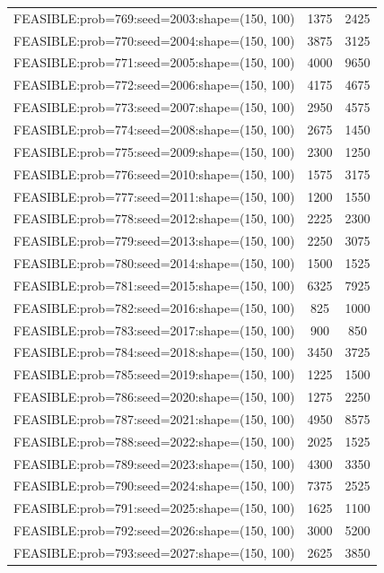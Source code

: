 \begin{longtable}{lcc}
FEASIBLE:prob=769:seed=2003:shape=(150, 100) &     1375 &  2425 \\
FEASIBLE:prob=770:seed=2004:shape=(150, 100) &     3875 &  3125 \\
FEASIBLE:prob=771:seed=2005:shape=(150, 100) &     4000 &  9650 \\
FEASIBLE:prob=772:seed=2006:shape=(150, 100) &     4175 &  4675 \\
FEASIBLE:prob=773:seed=2007:shape=(150, 100) &     2950 &  4575 \\
FEASIBLE:prob=774:seed=2008:shape=(150, 100) &     2675 &  1450 \\
FEASIBLE:prob=775:seed=2009:shape=(150, 100) &     2300 &  1250 \\
FEASIBLE:prob=776:seed=2010:shape=(150, 100) &     1575 &  3175 \\
FEASIBLE:prob=777:seed=2011:shape=(150, 100) &     1200 &  1550 \\
FEASIBLE:prob=778:seed=2012:shape=(150, 100) &     2225 &  2300 \\
FEASIBLE:prob=779:seed=2013:shape=(150, 100) &     2250 &  3075 \\
FEASIBLE:prob=780:seed=2014:shape=(150, 100) &     1500 &  1525 \\
FEASIBLE:prob=781:seed=2015:shape=(150, 100) &     6325 &  7925 \\
FEASIBLE:prob=782:seed=2016:shape=(150, 100) &      825 &  1000 \\
FEASIBLE:prob=783:seed=2017:shape=(150, 100) &      900 &   850 \\
FEASIBLE:prob=784:seed=2018:shape=(150, 100) &     3450 &  3725 \\
FEASIBLE:prob=785:seed=2019:shape=(150, 100) &     1225 &  1500 \\
FEASIBLE:prob=786:seed=2020:shape=(150, 100) &     1275 &  2250 \\
FEASIBLE:prob=787:seed=2021:shape=(150, 100) &     4950 &  8575 \\
FEASIBLE:prob=788:seed=2022:shape=(150, 100) &     2025 &  1525 \\
FEASIBLE:prob=789:seed=2023:shape=(150, 100) &     4300 &  3350 \\
FEASIBLE:prob=790:seed=2024:shape=(150, 100) &     7375 &  2525 \\
FEASIBLE:prob=791:seed=2025:shape=(150, 100) &     1625 &  1100 \\
FEASIBLE:prob=792:seed=2026:shape=(150, 100) &     3000 &  5200 \\
FEASIBLE:prob=793:seed=2027:shape=(150, 100) &     2625 &  3850 \\

\end{longtable}
